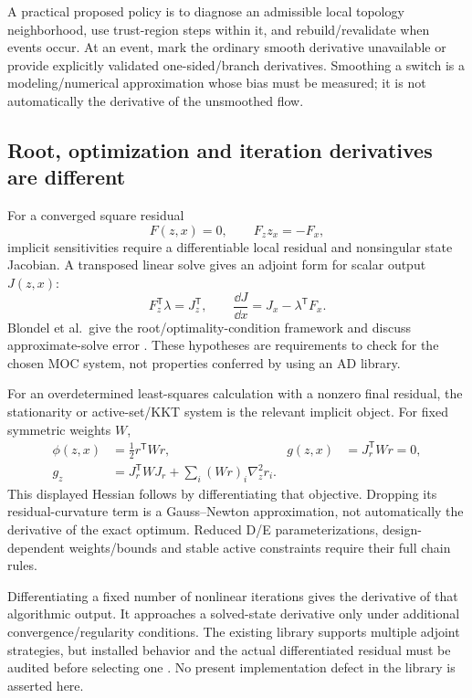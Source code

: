 A practical proposed policy is to diagnose an admissible local topology
neighborhood, use trust-region steps within it, and rebuild/revalidate
when events occur. At an event, mark the ordinary smooth derivative
unavailable or provide explicitly validated one-sided/branch derivatives.
Smoothing a switch is a modeling/numerical approximation whose bias must
be measured; it is not automatically the derivative of the unsmoothed
flow.

\subsection{Root, optimization and iteration derivatives are different}
For a converged square residual
\begin{equation}
F(z,x)=0,\qquad
F_z z_x=-F_x,
\label{eq:IFT}
\end{equation}
implicit sensitivities require a differentiable local residual and
nonsingular state Jacobian. A transposed linear solve gives an adjoint
form for scalar output \(J(z,x)\):
\begin{equation}
F_z^\mathsf{T}\lambda=J_z^\mathsf{T},
\qquad
\frac{\dd J}{\dd x}=J_x-\lambda^\mathsf{T}F_x.
\end{equation}
Blondel et al.\ give the root/optimality-condition framework and discuss
approximate-solve error \cite[\S2.1, PDF pp.~3--4;
\S3, PDF p.~6]{blondel}. These hypotheses are requirements to check for
the chosen MOC system, not properties conferred by using an AD library.

For an overdetermined least-squares calculation with a nonzero final
residual, the stationarity or active-set/KKT system is the relevant
implicit object. For fixed symmetric weights \(W\),
\begin{align}
\phi(z,x)&=\tfrac12r^\mathsf{T}Wr,&
g(z,x)&=J_r^\mathsf{T}Wr=0,\\
g_z&=J_r^\mathsf{T}WJ_r+
\sum_i(Wr)_i\nabla_z^2r_i.
\end{align}
This displayed Hessian follows by differentiating that objective.
Dropping its residual-curvature term is a Gauss--Newton approximation,
not automatically the derivative of the exact optimum. Reduced D/E
parameterizations, design-dependent weights/bounds and stable active
constraints require their full chain rules.

Differentiating a fixed number of nonlinear iterations gives the
derivative of that algorithmic output. It approaches a solved-state
derivative only under additional convergence/regularity conditions.
The existing library supports multiple adjoint strategies, but installed
behavior and the actual differentiated residual must be audited before
selecting one \cite{optimistix}. No present implementation defect in
the library is asserted here.

